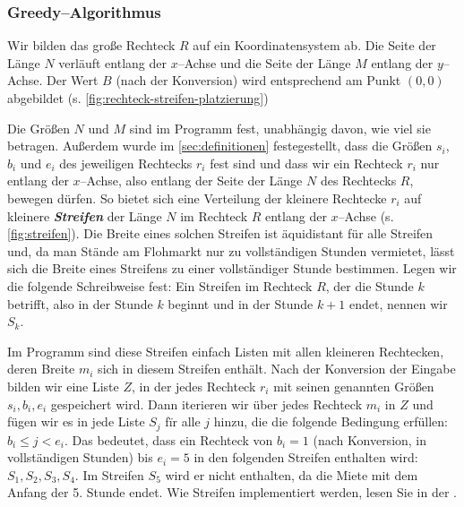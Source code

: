 \subsubsection{Greedy--Algorithmus}

Wir bilden das große Rechteck $R$ auf ein Koordinatensystem ab.
Die Seite der Länge $N$ verläuft entlang der $x$--Achse und die Seite der Länge
$M$ entlang der $y$--Achse.
Der Wert $B$ (nach der Konversion) wird entsprechend am Punkt $(0, 0)$ abgebildet (s. \cref{fig:rechteck-streifen-platzierung})

Die Größen $N$ und $M$ sind im Programm fest, unabhängig davon, wie viel sie betragen.
Außerdem wurde im \cref{sec:definitionen} festegestellt, dass die Größen $s_i$, $b_i$ und $e_i$
des jeweiligen Rechtecks $r_i$ fest sind und dass wir ein Rechteck $r_i$ nur entlang der $x$--Achse,
also entlang der Seite der Länge $N$ des Rechtecks $R$, bewegen dürfen.
So bietet sich eine Verteilung der kleinere Rechtecke $r_i$ auf kleinere \textit{\textbf{Streifen}}
der Länge $N$ im Rechteck $R$ entlang der $x$--Achse (s. \cref{fig:streifen}).
Die Breite eines solchen Streifen ist äquidistant für alle Streifen und, da
man Stände am Flohmarkt nur zu vollständigen Stunden vermietet, lässt sich
die Breite eines Streifens zu einer vollständiger Stunde bestimmen.
Legen wir die folgende Schreibweise fest: Ein Streifen im Rechteck $R$, der die
Stunde $k$ betrifft, also in der Stunde $k$ beginnt und in der Stunde $k+1$ endet, nennen wir $S_k$.


Im Programm sind diese Streifen einfach Listen mit allen kleineren Rechtecken, 
deren Breite $m_i$ sich in diesem Streifen enthält.
Nach der Konversion der Eingabe bilden wir eine Liste $Z$, in der jedes
Rechteck $r_i$ mit seinen genannten Größen $s_i, b_i, e_i$ gespeichert wird.
Dann iterieren wir über jedes Rechteck $m_i$ in $Z$ und fügen wir es in jede Liste $S_j$ fïr alle
$j$ hinzu, die die folgende Bedingung erfüllen: $b_i \leqslant j < e_i$.
Das bedeutet, dass ein Rechteck von $b_i = 1$ (nach Konversion, in vollständigen Stunden)
bis $e_i = 5$ in den folgenden Streifen enthalten wird: $S_1, S_2, S_3, S_4$. Im Streifen $S_5$
wird er nicht enthalten, da die Miete mit dem Anfang der 5. Stunde endet.
Wie Streifen implementiert werden, lesen Sie in der .


